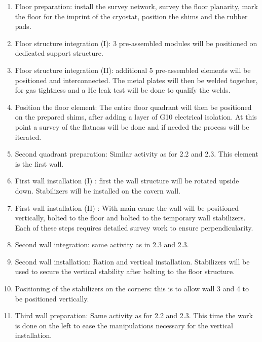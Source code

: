 \begin{enumerate}

\item Floor preparation: install the survey network, survey the floor planarity, mark
the floor for the imprint of the cryostat, position the shims and the rubber pads.

\item Floor structure integration (I): 3 pre-assembled modules will be positioned
on dedicated support structure.

\item Floor structure integration (II): additional 5 pre-assembled elements will be positioned and interconnected. The metal plates will then be welded together, for gas tightness and a He leak test will be done to qualify the welds.

\item Position the floor element: The entire floor quadrant will then be positioned on the prepared shims, after adding a layer of G10 electrical isolation. At this point a survey of the flatness will be done and if needed the process will be iterated.

\item Second quadrant preparation: Similar activity as for 2.2 and 2.3. This element is the first wall.

\item First wall installation (I) : first the wall structure will be rotated upside down. Stabilizers will be installed on the cavern wall.
 
\item First wall installation (II) : With main crane the wall will be positioned vertically, bolted to the floor and bolted to the temporary wall stabilizers. Each of these steps requires detailed survey work to ensure perpendicularity.
 
\item Second wall integration: same activity as in 2.3 and 2.3.
 
\item Second wall installation: Ration and vertical installation. Stabilizers will be used to secure the vertical stability after bolting to the floor structure.

\item Positioning of the stabilizers on the corners: this is to allow wall 3 and 4 to be positioned vertically.
 
\item Third wall preparation: Same activity as for 2.2 and 2.3. This time the work is done on the left to ease the manipulations necessary for the vertical installation.


\end{enumerate}
